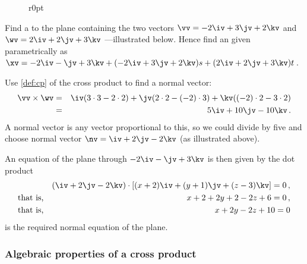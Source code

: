 \begin{wrapfigure}r{0pt}
\end{wrapfigure}
\begin{example} \label{eg:cpnvp}
Find a  to the plane containing the two vectors \(\vv=-2\iv+3\jv+2\kv\) and \(\wv=2\iv+2\jv+3\kv\) ---illustrated below.
Hence find an  given parametrically as \(\xv=-2\iv-\jv+3\kv+(-2\iv+3\jv+2\kv)s+(2\iv+2\jv+3\kv)t\)\,.
%

\begin{solution} 
Use \cref{def:cp} of the cross product to find a normal vector:
\begin{eqnarray*}
\vv\times\wv&=&
\iv(3\cdot 3-2\cdot 2)
+\jv(2\cdot 2-(-2)\cdot 3)
+\kv((-2)\cdot 2-3\cdot 2)
\\&=&5\iv+10\jv-10\kv\,.
\end{eqnarray*}
A normal vector is any vector proportional to this, so we could divide by five and choose normal vector \(\nv=\iv+2\jv-2\kv\) (as illustrated above).

An equation of the plane through \(-2\iv-\jv+3\kv\) is then given by the dot product
\begin{eqnarray*}
&&(\iv+2\jv-2\kv)\cdot[(x+2)\iv+(y+1)\jv+(z-3)\kv]=0\,,
\\\text{that is,}&& x+2+2y+2-2z+6=0\,,
\\\text{that is,}&& x+2y-2z+10=0
\end{eqnarray*}
is the required normal equation of the plane.
\aqed
\end{solution}
\end{example}




\subsubsection{Algebraic properties of a cross product}

